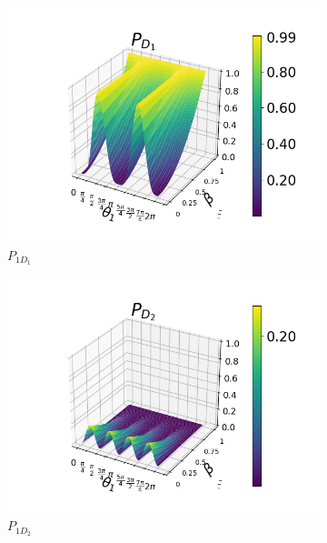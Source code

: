 \documentclass[12pt]{book}
\begin{document}
\begin{figure}[t]
\centering
\begin{subfigure}[b]{0.4\linewidth}
\includegraphics[width=\linewidth]{images/PD1_h.png}
\caption{$P_{1D_{1}}$}
\label{fig:BS1}
\end{subfigure}
\begin{subfigure}[b]{0.4\linewidth}
\includegraphics[width=\linewidth]{images/PD2_h.png}
\caption{$P_{1D_{2}}$}
\label{fig:westminster_aerea}
\end{subfigure}
\begin{subfigure}[b]{0.4\linewidth}

\end{subfigure}
\end{figure}
\end{document}
